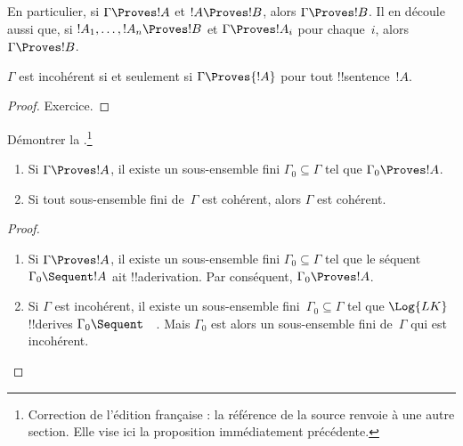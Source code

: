 \documentclass[../../../include/open-logic-section]{subfiles}
\begin{document}
En particulier, si $\Gamma\Proves !A$ et $!A\Proves !B$,
alors $\Gamma\Proves !B$.
Il en découle aussi que, si $!A_1,\dots,!A_n\Proves !B$
et $\Gamma\Proves !A_i$ pour chaque~$i$, alors
$\Gamma\Proves !B$.

\begin{prop}
$\Gamma$ est incohérent si et seulement si
$\Gamma\Proves {!A}$ pour tout !!{sentence}~$!A$.
\end{prop}

\begin{proof}
Exercice.
\end{proof}

\begin{prob}
Démontrer la .\footnote{Correction
de l'édition française : la référence de la source renvoie
à une autre section. Elle vise ici la proposition immédiatement
précédente.}
\end{prob}

\begin{prop}[Compacité]
\begin{enumerate}
\item Si $\Gamma\Proves !A$, il existe un sous-ensemble fini
$\Gamma_0\subseteq\Gamma$ tel que $\Gamma_0\Proves !A$.
\item Si tout sous-ensemble fini de~$\Gamma$ est cohérent,
alors $\Gamma$ est cohérent.
\end{enumerate}
\end{prop}

\begin{proof}
\begin{enumerate}
\item Si $\Gamma\Proves !A$, il existe un sous-ensemble fini
$\Gamma_0\subseteq\Gamma$ tel que le séquent
$\Gamma_0\Sequent !A$ ait !!a{derivation}.
Par conséquent, $\Gamma_0\Proves !A$.
\item Si $\Gamma$ est incohérent, il existe un sous-ensemble
fini~$\Gamma_0\subseteq\Gamma$ tel que $\Log{LK}$ !!{derive}s
$\Gamma_0\Sequent\quad$. Mais $\Gamma_0$ est alors un
sous-ensemble fini de~$\Gamma$ qui est incohérent.
\end{enumerate}
\end{proof}
\end{document}
